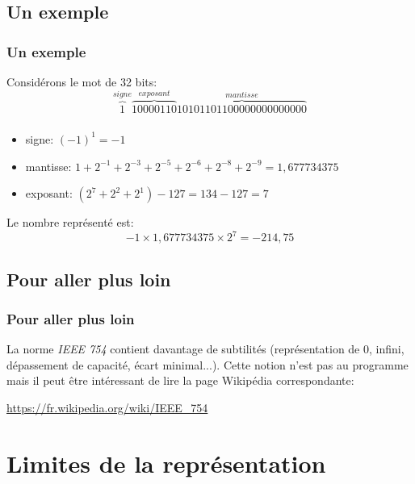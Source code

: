 \documentclass[svgnames,11pt]{beamer}
\begin{document}
\subsection{Un exemple}
\begin{frame}
    \frametitle{Un exemple}
    Considérons le mot de 32 bits:
    $$\overbrace{1}^{signe}\overbrace{10000110}^{exposant}\overbrace{10101101100000000000000}^{mantisse}$$
    

\end{frame}
\begin{frame}
    \frametitle{}

    \begin{itemize}
        \item signe: $(-1)^1=-1$
        \item mantisse: $1+2^{-1}+2^{-3}+2^{-5}+2^{-6}+2^{-8}+2^{-9} = 1,677734375$
        \item exposant: $(2^7+2^2+2^1)-127=134-127=7$
        \end{itemize}
        Le nombre représenté est:
        $$-1×1,677734375×2^7=-214,75$$
\end{frame}
\subsection{Pour aller plus loin}
\begin{frame}
    \frametitle{Pour aller plus loin}

    La norme \emph{IEEE 754} contient davantage de subtilités (représentation de 0, infini, dépassement de capacité, écart minimal...). Cette notion n'est pas au programme mais il peut être intéressant de lire la page Wikipédia correspondante:
\begin{center}
\url{https://fr.wikipedia.org/wiki/IEEE_754}
\end{center} 

\end{frame}
\section{Limites de la représentation}
\end{document}
